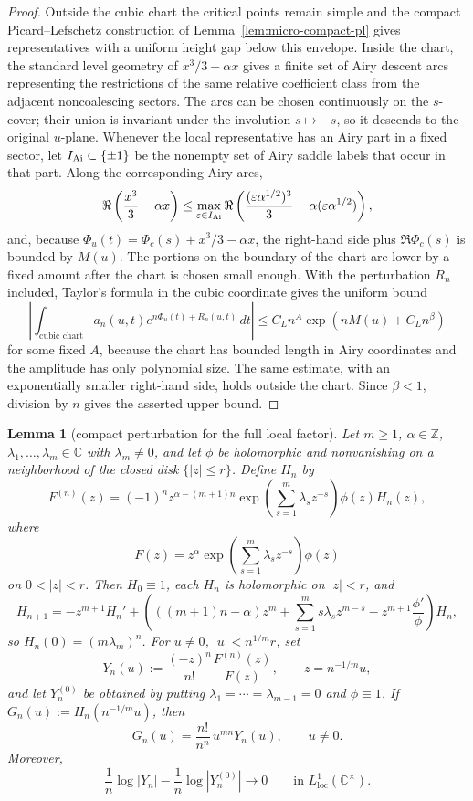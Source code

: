 \documentclass[reqno]{article}
\newtheorem{lem}[theorem]{Lemma}
\theoremstyle{definition}
\theoremstyle{remark}
\theoremstyle{plain}
\newcommand{\C}{\mathbb C}
\begin{document}
\begin{proof}
Outside the cubic chart the critical points remain simple and the compact Picard--Lefschetz construction of Lemma~\ref{lem:micro-compact-pl} gives representatives with a uniform height gap below this envelope. Inside the chart, the standard level geometry of $x^3/3-\alpha x$ gives a finite set of Airy descent arcs representing the restrictions of the same relative coefficient class from the adjacent noncoalescing sectors. The arcs can be chosen continuously on the $s$-cover; their union is invariant under the involution $s\mapsto -s$, so it descends to the original $u$-plane. Whenever the local representative has an Airy part in a fixed sector, let $I_{\rm Ai}\subset\{\pm1\}$ be the nonempty set of Airy saddle labels that occur in that part. Along the corresponding Airy arcs,
\[
\Re\left(\frac{x^3}{3}-\alpha x\right)
\le
\max_{\varepsilon\in I_{\rm Ai}}
\Re\left(\frac{(\varepsilon\alpha^{1/2})^3}{3}-\alpha(\varepsilon\alpha^{1/2})\right),
\]
and, because $\Phi_u(t)=\Phi_c(s)+x^3/3-\alpha x$, the right-hand side plus $\Re\Phi_c(s)$ is bounded by $M(u)$. The portions on the boundary of the chart are lower by a fixed amount after the chart is chosen small enough. With the perturbation $R_n$ included, Taylor's formula in the cubic coordinate gives the uniform bound
\[
\left|\int_{\text{cubic chart}} a_n(u,t)e^{n\Phi_u(t)+R_n(u,t)}\,dt\right|
\le C_L n^A\exp\left(nM(u)+C_L n^\beta\right)
\]
for some fixed $A$, because the chart has bounded length in Airy coordinates and the amplitude has only polynomial size. The same estimate, with an exponentially smaller right-hand side, holds outside the chart. Since $\beta<1$, division by $n$ gives the asserted upper bound.
\end{proof}

\begin{lem}[compact perturbation for the full local factor]\label{lem:full-local-perturb}
Let $m\ge1$, $\alpha\in\mathbb Z$, $\lambda_1,\ldots,\lambda_m\in\C$ with $\lambda_m\ne0$, and let $\phi$ be holomorphic and nonvanishing on a neighborhood of the closed disk $\{|z|\le r\}$. Define $H_n$ by
$$
F^{(n)}(z)=(-1)^n z^{\alpha-(m+1)n}
\exp\!\left(\sum_{s=1}^m\lambda_s z^{-s}\right)\phi(z)H_n(z),
$$
where
$$
F(z)=z^\alpha\exp\!\left(\sum_{s=1}^m\lambda_s z^{-s}\right)\phi(z)
$$
on $0<|z|<r$. Then $H_0\equiv1$, each $H_n$ is holomorphic on $|z|<r$, and
\[
H_{n+1}=-z^{m+1}H_n'
+\left(((m+1)n-\alpha)z^m+\sum_{s=1}^m s\lambda_s z^{m-s}-z^{m+1}\frac{\phi'}{\phi}\right)H_n,
\]
so $H_n(0)=(m\lambda_m)^n$. For $u\ne0$, $|u|<n^{1/m}r$, set
$$
Y_n(u):=\frac{(-z)^n}{n!}\frac{F^{(n)}(z)}{F(z)},\qquad z=n^{-1/m}u,
$$
and let $Y_n^{(0)}$ be obtained by putting $\lambda_1=\cdots=\lambda_{m-1}=0$ and $\phi\equiv1$. If $G_n(u):=H_n(n^{-1/m}u)$, then
\begin{equation}\label{eq:H-Y-relation}
G_n(u)=\frac{n!}{n^n}\,u^{mn}Y_n(u),
\qquad u\ne0.
\end{equation}
Moreover,
\begin{equation}\label{eq:full-local-perturb-L1}
\frac1n\log|Y_n|-\frac1n\log|Y_n^{(0)}|
\longrightarrow0
\qquad\text{in }L^1_{\mathrm{loc}}(\C^\times).
\end{equation}
\end{lem}
\end{document}

